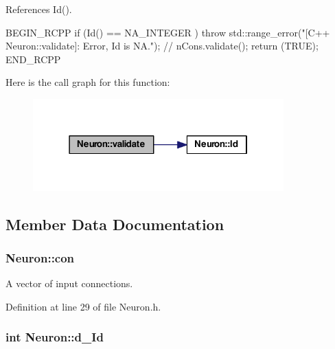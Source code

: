 References Id().


\begin{DoxyCode}
{
  BEGIN_RCPP
  if (Id() == NA_INTEGER ) throw std::range_error("[C++ Neuron::validate]: Error,
       Id is NA.");
 // nCons.validate();
  return (TRUE);
END_RCPP}
\end{DoxyCode}


Here is the call graph for this function:
\nopagebreak
\begin{figure}[H]
\begin{center}
\leavevmode
\includegraphics[width=274pt]{class_neuron_a95327aa80a9ec949491f214a0c159b5a_cgraph}
\end{center}
\end{figure}




\subsection{Member Data Documentation}
\hypertarget{class_neuron_a1e92229eb19c3f322e118bdf23b9844e}{
\subsubsection[{con}]{ {\bf Neuron::con}}}
\label{class_neuron_a1e92229eb19c3f322e118bdf23b9844e}


A vector of input connections. 



Definition at line 29 of file Neuron.h.

\hypertarget{class_neuron_a08ff8c97744020f1900067617c43a349}{
\subsubsection[{d\_\-Id}]{\setlength{\rightskip}{0pt plus 5cm}int {\bf Neuron::d\_\-Id}}}
\label{class_neuron_a08ff8c97744020f1900067617c43a349}


